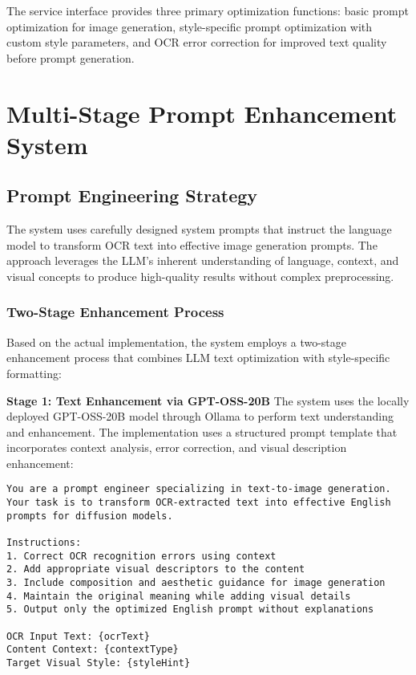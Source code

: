 The service interface provides three primary optimization functions: basic prompt optimization for image generation, style-specific prompt optimization with custom style parameters, and OCR error correction for improved text quality before prompt generation.

\section{Multi-Stage Prompt Enhancement System}

\subsection{Prompt Engineering Strategy}

The system uses carefully designed system prompts that instruct the language model to transform OCR text into effective image generation prompts. The approach leverages the LLM's inherent understanding of language, context, and visual concepts to produce high-quality results without complex preprocessing.

\subsubsection{Two-Stage Enhancement Process}

Based on the actual implementation, the system employs a two-stage enhancement process that combines LLM text optimization with style-specific formatting:

\textbf{Stage 1: Text Enhancement via GPT-OSS-20B}
The system uses the locally deployed GPT-OSS-20B model through Ollama to perform text understanding and enhancement. The implementation uses a structured prompt template that incorporates context analysis, error correction, and visual description enhancement:

\begin{lstlisting}[language=text,basicstyle=\footnotesize\ttfamily,frame=single,breaklines=true,columns=flexible,caption={Prompt Template for GPT-OSS-20B Enhancement},label={lst:main_prompt}]
You are a prompt engineer specializing in text-to-image generation.
Your task is to transform OCR-extracted text into effective English 
prompts for diffusion models.

Instructions:
1. Correct OCR recognition errors using context
2. Add appropriate visual descriptors to the content
3. Include composition and aesthetic guidance for image generation
4. Maintain the original meaning while adding visual details
5. Output only the optimized English prompt without explanations

OCR Input Text: {ocrText}
Content Context: {contextType}
Target Visual Style: {styleHint}
\end{lstlisting}

